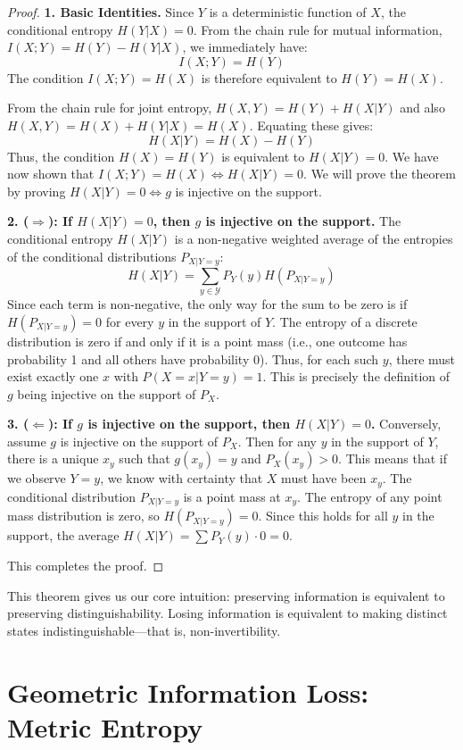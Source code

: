 \documentclass[12pt]{article}
\theoremstyle{definition}
\theoremstyle{plain}
\begin{document}
\begin{proof}
\textbf{1. Basic Identities.}
Since $Y$ is a deterministic function of $X$, the conditional entropy $H(Y|X)=0$. From the chain rule for mutual information, $I(X;Y) = H(Y) - H(Y|X)$, we immediately have:
\[
I(X;Y) = H(Y)
\]
The condition $I(X;Y) = H(X)$ is therefore equivalent to $H(Y) = H(X)$.

From the chain rule for joint entropy, $H(X,Y) = H(Y) + H(X|Y)$ and also $H(X,Y) = H(X) + H(Y|X) = H(X)$. Equating these gives:
\[
H(X|Y) = H(X) - H(Y)
\]
Thus, the condition $H(X)=H(Y)$ is equivalent to $H(X|Y)=0$. We have now shown that $I(X;Y)=H(X) \iff H(X|Y)=0$. We will prove the theorem by proving $H(X|Y)=0 \iff g$ is injective on the support.

\textbf{2. ($\Rightarrow$): If $H(X|Y) = 0$, then $g$ is injective on the support.}
The conditional entropy $H(X|Y)$ is a non-negative weighted average of the entropies of the conditional distributions $P_{X|Y=y}$:
\[
H(X|Y) = \sum_{y \in \mathcal{Y}} P_Y(y) H(P_{X|Y=y})
\]
Since each term is non-negative, the only way for the sum to be zero is if $H(P_{X|Y=y}) = 0$ for every $y$ in the support of $Y$. The entropy of a discrete distribution is zero if and only if it is a point mass (i.e., one outcome has probability 1 and all others have probability 0). Thus, for each such $y$, there must exist exactly one $x$ with $P(X=x|Y=y)=1$. This is precisely the definition of $g$ being injective on the support of $P_X$.

\textbf{3. ($\Leftarrow$): If $g$ is injective on the support, then $H(X|Y)=0$.}
Conversely, assume $g$ is injective on the support of $P_X$. Then for any $y$ in the support of $Y$, there is a unique $x_y$ such that $g(x_y)=y$ and $P_X(x_y)>0$. This means that if we observe $Y=y$, we know with certainty that $X$ must have been $x_y$. The conditional distribution $P_{X|Y=y}$ is a point mass at $x_y$. The entropy of any point mass distribution is zero, so $H(P_{X|Y=y})=0$. Since this holds for all $y$ in the support, the average $H(X|Y) = \sum P_Y(y) \cdot 0 = 0$.

This completes the proof.
\end{proof}

This theorem gives us our core intuition: preserving information is equivalent to preserving distinguishability. Losing information is equivalent to making distinct states indistinguishable—that is, non-invertibility.

\section{Geometric Information Loss: Metric Entropy}
\end{document}
